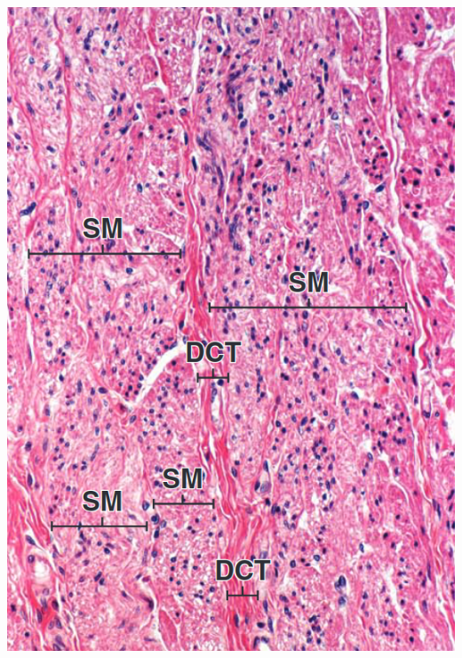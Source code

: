 \begin{itemize}
\begin{center}
    \includegraphics[scale=0.25]{images/week-1-rp13.png} 

\end{center}
\end{itemize}
